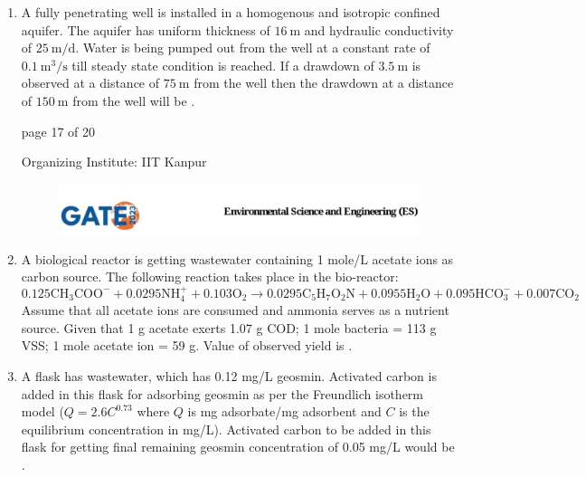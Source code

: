 \documentclass[journal,12pt,onecolumn]{IEEEtran}
\theoremstyle{remark}
\begin{document}
\begin{enumerate}[start=1, label={Q\arabic*.}]
If a pressure gauge is connected with the vessel using $1.5\ \text{cm}$ diameter tube, the reading of the gauge will be \underline{\hspace{2cm}} . \hfill{}

\item A fully penetrating well is installed in a homogenous and isotropic confined aquifer. The aquifer has uniform thickness of $16\ \text{m}$ and hydraulic conductivity of $25\ \text{m/d}$. Water is being pumped out from the well at a constant rate of $0.1\ \text{m}^3/\text{s}$ till steady state condition is reached. If a drawdown of $3.5\ \text{m}$ is observed at a distance of $75\ \text{m}$ from the well then the drawdown at a distance of $150\ \text{m}$ from the well will be \underline{\hspace{2cm}} . \hfill{}
\vfill
\begin{center}
{\Large page 17 of 20}
\end{center}
\RaggedRight
{\color{orange}
{\Large Organizing Institute: IIT Kanpur}}
\newpage
\begin{figure}
    
    \includegraphics[width=1\linewidth]{figs/latex.jpg}
    
\end{figure}
\item A biological reactor is getting wastewater containing 1 mole/L acetate ions as carbon source. The following reaction takes place in the bio-reactor:
\[
0.125\mathrm{CH_3COO^-} + 0.0295\mathrm{NH_4^+} + 0.103\mathrm{O_2} \rightarrow 0.0295\mathrm{C_5H_7O_2N} + 0.0955\mathrm{H_2O} + 0.095\mathrm{HCO_3^-} + 0.007\mathrm{CO_2}
\]
Assume that all acetate ions are consumed and ammonia serves as a nutrient source. Given that 1 g acetate exerts 1.07 g COD; 1 mole bacteria = 113 g VSS; 1 mole acetate ion = 59 g. Value of observed yield is \underline{\hspace{2cm}} .  
\hfill{}

\item A flask  has wastewater, which has 0.12 mg/L geosmin. Activated carbon is added in this flask for adsorbing geosmin as per the Freundlich isotherm model ($Q = 2.6C^{0.73}$ where $Q$ is mg adsorbate/mg adsorbent and $C$ is the equilibrium concentration in mg/L). Activated carbon to be added in this flask for getting final remaining geosmin concentration of 0.05 mg/L would be \underline{\hspace{2cm}} .  
\hfill{}


\end{enumerate}
\end{document}
